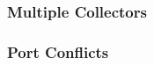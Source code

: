 \subsubsection{\label{sec:Ports-MultipleCollectors}Multiple Collectors}
\Todo


\subsubsection{\label{sec:Ports-Conflicts}Port Conflicts}
\Todo

